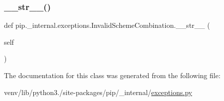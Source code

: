 \subsubsection{\texorpdfstring{\+\_\+\+\_\+str\+\_\+\+\_\+()}{\_\_str\_\_()}}
{\footnotesize\ttfamily def pip.\+\_\+internal.\+exceptions.\+Invalid\+Scheme\+Combination.\+\_\+\+\_\+str\+\_\+\+\_\+ (\begin{DoxyParamCaption}\item[{}]{self }\end{DoxyParamCaption})}



The documentation for this class was generated from the following file\+:\begin{DoxyCompactItemize}
\item 
venv/lib/python3./site-\/packages/pip/\+\_\+internal/\hyperlink{pip_2__internal_2exceptions_8py}{exceptions.\+py}\end{DoxyCompactItemize}
